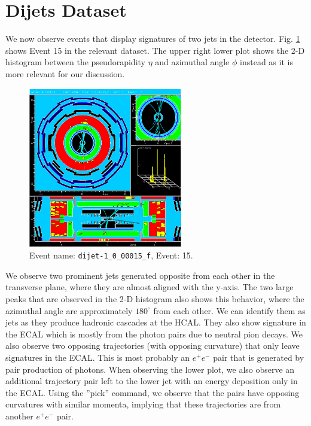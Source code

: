 \documentclass[a4paper]{report}
\numberwithin{equation}{section}
\begin{document}
\section{Dijets Dataset}

We now observe events that display signatures of two jets in the detector. Fig. \ref{fig:dijets} shows Event 15 in the relevant dataset. 
The upper right lower plot shows the 2-D histogram between the pseudorapidity $\eta$ and azimuthal angle $\phi$ instead as it is more 
relevant for our discussion.

\begin{figure}[htpb]
    \centering
    \includegraphics[width=0.6\textwidth]{dijet_event15.eps}
    \caption{Event name: \texttt{dijet-1\_0\_00015\_f}, Event: 15. }
    \label{fig:dijets}
\end{figure}

We observe two prominent jets generated opposite from each other in the transverse plane, where they are almost aligned with the y-axis.
 The two large peaks that are observed in the 2-D histogram also shows this behavior, where the azimuthal angle are approximately $180^\circ$ from each other. We can 
identify them as jets as they produce hadronic cascades at the HCAL. They also show signature in the ECAL which is mostly from the photon
pairs due to neutral pion decays. We also observe two opposing trajectories (with opposing curvature) that only leave signatures
 in the ECAL. This is most probably an $e^+e^-$ pair that is generated by pair production of photons. When observing the lower plot, 
 we also observe an additional trajectory pair left to the lower jet with an energy deposition only in the ECAL.
  Using the ''pick'' command, we observe that the pairs have opposing curvatures with similar momenta, implying that these trajectories
  are from another $e^+e^-$ pair. 
\end{document}
